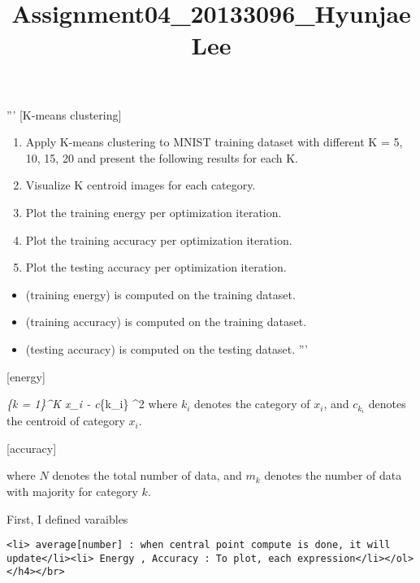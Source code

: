 \documentclass[11pt]{article}
\title{Assignment04\_20133096\_HyunjaeLee}
\providecommand{\tightlist}{%
      \setlength{\itemsep}{0pt}\setlength{\parskip}{0pt}}
\begin{document}
    
    
    \maketitle
    
    

    
    ''' {[}K-means clustering{]}

\begin{enumerate}
\def\labelenumi{\arabic{enumi}.}
\tightlist
\item
  Apply K-means clustering to MNIST training dataset with different K =
  5, 10, 15, 20 and present the following results for each K.
\item
  Visualize K centroid images for each category.
\item
  Plot the training energy per optimization iteration.
\item
  Plot the training accuracy per optimization iteration.
\item
  Plot the testing accuracy per optimization iteration.
\end{enumerate}

\begin{itemize}
\tightlist
\item
  (training energy) is computed on the training dataset.
\item
  (training accuracy) is computed on the training dataset.
\item
  (testing accuracy) is computed on the testing dataset. '''\\
\end{itemize}

{[}energy{]}

\sum\emph{\{k = 1\}\^{}K \textbar{} x\_i - c}\{k\_i\} \textbar{}\^{}2
where \(k_i\) denotes the category of \(x_i\), and \(c_{k_i}\) denotes
the centroid of category \(x_i\).

{[}accuracy{]}

 where \(N\) denotes the total number of
data, and \(m_k\) denotes the number of data with majority for category
\(k\).

First, I defined varaibles

\begin{verbatim}
<li> average[number] : when central point compute is done, it will update</li><li> Energy , Accuracy : To plot, each expression</li></ol></h4></br>
\end{verbatim}
\end{document}
